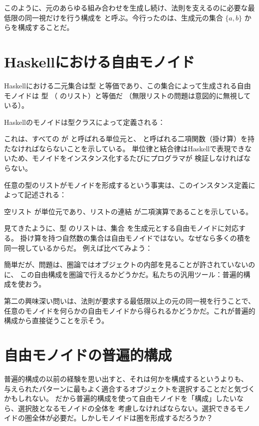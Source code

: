 このように、元のあらゆる組み合わせを生成し続け、法則を支えるのに必要な最低限の同一視だけを行う構成を
と呼ぶ。今行ったのは、生成元の集合 $\{a, b\}$ からを構成することだ。

\section{Haskellにおける自由モノイド}

Haskellにおける二元集合は型  と等価であり、この集合によって生成される自由モノイドは
型 \code{{[}Bool{]}}（ のリスト）と等価だ
（無限リストの問題は意図的に無視している）。

Haskellのモノイドは型クラスによって定義される：

これは、すべての  が  と呼ばれる単位元と、
 と呼ばれる二項関数（掛け算）を持たなければならないことを示している。
単位律と結合律はHaskellで表現できないため、モノイドをインスタンス化するたびにプログラマが
検証しなければならない。

任意の型のリストがモノイドを形成するという事実は、このインスタンス定義によって記述される：

空リスト \code{{[}{]}} が単位元であり、リストの連結 \code{(++)} が二項演算であることを示している。

見てきたように、型  のリストは、集合  を生成元とする自由モノイドに対応する。
掛け算を持つ自然数の集合は自由モノイドではない。なぜなら多くの積を同一視しているからだ。
例えば比べてみよう：

簡単だが、問題は、圏論ではオブジェクトの内部を見ることが許されていないのに、
この自由構成を圏論で行えるかどうかだ。私たちの汎用ツール：普遍的構成を使おう。

第二の興味深い問いは、法則が要求する最低限以上の元の同一視を行うことで、
任意のモノイドを何らかの自由モノイドから得られるかどうかだ。これが普遍的構成から直接従うことを示そう。

\section{自由モノイドの普遍的構成}

普遍的構成の以前の経験を思い出すと、それは何かを構成するというよりも、
与えられたパターンに最もよく適合するオブジェクトを選択することだと気づくかもしれない。
だから普遍的構成を使って自由モノイドを「構成」したいなら、選択肢となるモノイドの全体を
考慮しなければならない。選択できるモノイドの圏全体が必要だ。しかしモノイドは圏を形成するだろうか？

